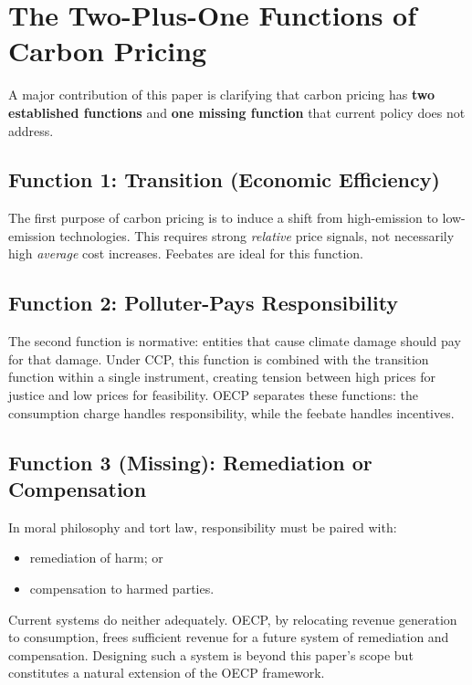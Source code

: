 \documentclass[12pt]{article}
\begin{document}

\section{The Two-Plus-One Functions of Carbon Pricing}

A major contribution of this paper is clarifying that carbon pricing 
has \textbf{two established functions} and \textbf{one missing function} that 
current policy does not address.

\subsection{Function 1: Transition (Economic Efficiency)}

The first purpose of carbon pricing is to induce a shift from high-emission 
to low-emission technologies.  
This requires strong \textit{relative} price signals, not necessarily high 
\textit{average} cost increases.  
Feebates are ideal for this function.

\subsection{Function 2: Polluter-Pays Responsibility}

The second function is normative: 
entities that cause climate damage should pay for that damage.  
Under CCP, this function is combined with the transition function within a 
single instrument, creating tension between high prices for justice and 
low prices for feasibility.  
OECP separates these functions: the consumption charge handles responsibility, 
while the feebate handles incentives.

\subsection{Function 3 (Missing): Remediation or Compensation}

In moral philosophy and tort law, responsibility must be paired with:
\begin{itemize}
    \item remediation of harm; or  
    \item compensation to harmed parties.
\end{itemize}
Current systems do neither adequately.  
OECP, by relocating revenue generation to consumption, frees sufficient revenue 
for a future system of remediation and compensation.  
Designing such a system is beyond this paper’s scope but constitutes a 
natural extension of the OECP framework.
\end{document}
